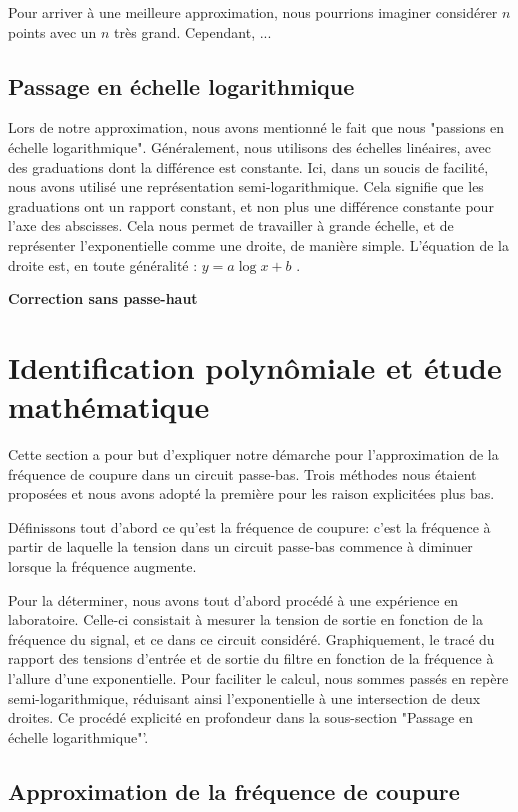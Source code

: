 Pour arriver à une meilleure approximation, nous pourrions imaginer considérer $n$ points avec un 
$n$ très grand. Cependant, ...

\subsection{Passage en échelle logarithmique}

Lors de notre approximation, nous avons mentionné le fait que nous "passions en échelle logarithmique". 
Généralement, nous utilisons des échelles linéaires, avec des graduations dont la différence est constante.
Ici, dans un soucis de facilité, nous avons utilisé une représentation semi-logarithmique. Cela signifie
que les graduations ont un rapport constant, et non plus une différence constante pour l'axe des abscisses.
Cela nous permet de travailler à grande échelle, et de représenter l'exponentielle comme une droite, de
manière simple. L'équation de la droite est, en toute généralité : $y=a\log{x}+b$ .

\textbf{Correction sans passe-haut}


\section{Identification polynômiale et étude mathématique}

Cette section a pour but d'expliquer notre démarche pour l'approximation de la fréquence de coupure
dans un circuit passe-bas. Trois méthodes nous étaient proposées et nous avons adopté
la première pour les raison explicitées plus bas.

Définissons tout d'abord ce qu'est la fréquence de coupure: c'est la fréquence à partir de laquelle
la tension dans un circuit passe-bas commence à diminuer
lorsque la fréquence augmente.

Pour la déterminer, nous avons tout d'abord procédé à une expérience en laboratoire.
Celle-ci consistait à mesurer la tension de sortie en fonction de la fréquence du signal, et ce dans
ce circuit considéré.
Graphiquement, le tracé du rapport des tensions d'entrée et de sortie du filtre en fonction de la
fréquence à l'allure d'une exponentielle. Pour faciliter le calcul, nous sommes passés en repère
semi-logarithmique, réduisant ainsi l'exponentielle à une intersection de deux droites. Ce procédé
explicité en profondeur dans la sous-section "Passage en échelle logarithmique"'.

\subsection{Approximation de la fréquence de coupure}

